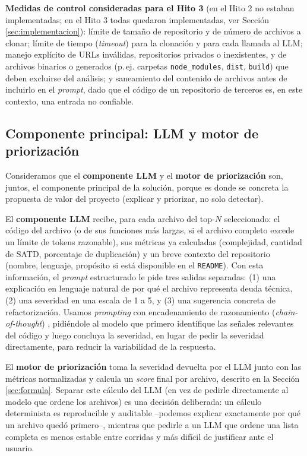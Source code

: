 
\textbf{Medidas de control consideradas para el Hito 3} (en el Hito 2 no estaban implementadas; en el Hito 3 todas quedaron implementadas, ver Sección \ref{sec:implementacion}): límite de tamaño de repositorio y de número de archivos a clonar; límite de tiempo (\textit{timeout}) para la clonación y para cada llamada al LLM; manejo explícito de URLs inválidas, repositorios privados o inexistentes, y de archivos binarios o generados (p.\,ej. carpetas \texttt{node\_modules}, \texttt{dist}, \texttt{build}) que deben excluirse del análisis; y saneamiento del contenido de archivos antes de incluirlo en el \textit{prompt}, dado que el código de un repositorio de terceros es, en este contexto, una entrada no confiable.

\subsection{Componente principal: LLM y motor de priorización}

Consideramos que el \textbf{componente LLM} y el \textbf{motor de priorización} son, juntos, el componente principal de la solución, porque es donde se concreta la propuesta de valor del proyecto (explicar y priorizar, no solo detectar).

El \textbf{componente LLM} recibe, para cada archivo del top-$N$ seleccionado: el código del archivo (o de sus funciones más largas, si el archivo completo excede un límite de tokens razonable), sus métricas ya calculadas (complejidad, cantidad de SATD, porcentaje de duplicación) y un breve contexto del repositorio (nombre, lenguaje, propósito si está disponible en el \texttt{README}). Con esta información, el \textit{prompt} estructurado le pide tres salidas separadas: (1) una explicación en lenguaje natural de por qué el archivo representa deuda técnica, (2) una severidad en una escala de 1 a 5, y (3) una sugerencia concreta de refactorización. Usamos \textit{prompting} con encadenamiento de razonamiento (\textit{chain-of-thought}) \parencite{Wei2022}, pidiéndole al modelo que primero identifique las señales relevantes del código y luego concluya la severidad, en lugar de pedir la severidad directamente, para reducir la variabilidad de la respuesta.

El \textbf{motor de priorización} toma la severidad devuelta por el LLM junto con las métricas normalizadas y calcula un \textit{score} final por archivo, descrito en la Sección \ref{sec:formula}. Separar este cálculo del LLM (en vez de pedirle directamente al modelo que ordene los archivos) es una decisión deliberada: un cálculo determinista es reproducible y auditable --podemos explicar exactamente por qué un archivo quedó primero--, mientras que pedirle a un LLM que ordene una lista completa es menos estable entre corridas y más difícil de justificar ante el usuario.


